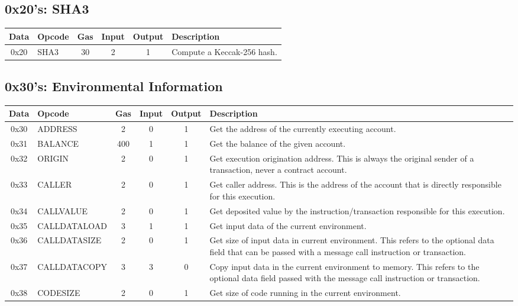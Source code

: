 \documentclass[10pt,letterpaper,leqno,bibliography=totoc]{scrartcl}
\newenvironment{alphafootnotes}
{\par\edef\savedfootnotenumber{\number\value{footnote}}
\renewcommand{\thefootnote}{\alph{footnote}}
\setcounter{footnote}{0}}
{\par\setcounter{footnote}{\savedfootnotenumber}}
\begin{document}
\begin{alphafootnotes}
	        \subsection{0x20's: SHA3}
			\begin{longtable}{|cP{2.8cm}cccp{6cm}|}
			\hline
		        \textbf{Data} & \textbf{Opcode} & \textbf{Gas}  & \textbf{Input}  & \textbf{Output} & \textbf{Description} \\
			\hline
			0x20 & SHA3 & 30 & 2 & 1 & Compute a Keccak-256 hash. \\
			\hline
			\end{longtable}

        	\subsection{0x30's: Environmental Information}
			\begin{longtable}{|cP{2.8cm}cccp{6cm}|}
			\hline
	        	\textbf{Data} & \textbf{Opcode} & \textbf{Gas}  & \textbf{Input}  & \textbf{Output} & \textbf{Description} \\
			\hline
			0x30 & ADDRESS & 2 & 0 & 1 & Get the address of the currently executing account. \\
			0x31 & BALANCE & 400 & 1 & 1 & Get the balance of the given account. \\
			0x32 & ORIGIN & 2 & 0 & 1 & Get execution origination address. This is always the original sender of a transaction, never a contract account. \\
			0x33 & CALLER & 2 & 0 & 1 & Get caller address. This is the address of the account that is directly responsible for this execution. \\
			0x34 & CALLVALUE & 2 & 0 & 1 & Get deposited value by the instruction/transaction responsible for this execution. \\
			0x35 & CALLDATALOAD & 3 & 1 & 1 & Get input data of the current environment. \\
			0x36 & CALLDATASIZE & 2 & 0 & 1 & Get size of input data in current environment. This refers to the optional data field that can be passed with a message call instruction or transaction.\\
			0x37 & CALLDATACOPY & 3 & 3 & 0 & Copy input data in the current environment to memory. This refers to the optional data field passed with the message call instruction or transaction. \\
			0x38 & CODESIZE & 2 & 0 & 1 & Get size of code running in the current environment. \\

\end{longtable}
\end{alphafootnotes}
\end{document}
